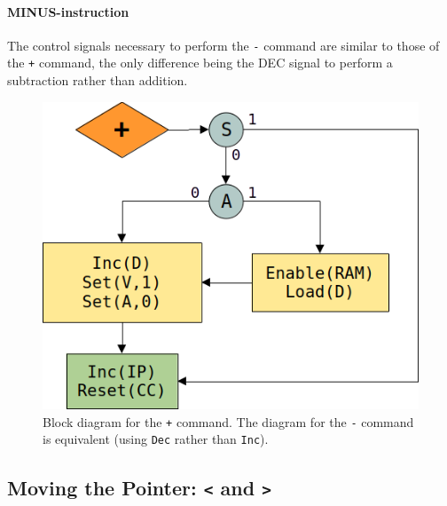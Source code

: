 \paragraph{MINUS-instruction} The control signals necessary to perform the \texttt{-} command are similar to those of the \texttt{+} command, the only difference being the DEC signal to perform a subtraction rather than addition.


\begin{figure}[H]
  \centering
  \includegraphics[scale=0.3]{img/plusalg}
  \caption{Block diagram for the \texttt{+} command. The diagram for the \texttt{-} command is equivalent (using \texttt{Dec} rather than \texttt{Inc}).}
  \label{fig:plusalg}
\end{figure}

\subsection{Moving the Pointer: \texttt{<} and \texttt{>}} \label{sec:sequences:<>}
